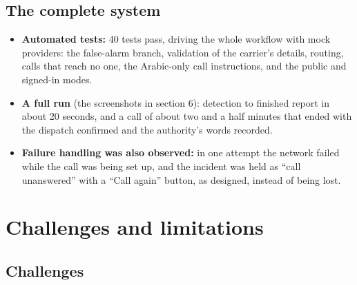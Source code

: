 \documentclass[11pt,a4paper]{article}
\begin{document}
\subsection{The complete system}

\begin{itemize}
  \item \textbf{Automated tests:} 40 tests pass, driving the whole workflow with mock providers: the
        false-alarm branch, validation of the carrier's details, routing, calls that reach no one,
        the Arabic-only call instructions, and the public and signed-in modes.
  \item \textbf{A full run} (the screenshots in section 6): detection to finished report in about 20
        seconds, and a call of about two and a half minutes that ended with the dispatch confirmed and the
        authority's words recorded.
  \item \textbf{Failure handling was also observed:} in one attempt the network failed while the call
        was being set up, and the incident was held as ``call unanswered'' with a ``Call again''
        button, as designed, instead of being lost.
\end{itemize}

\section{Challenges and limitations}

\subsection{Challenges}
\end{document}
